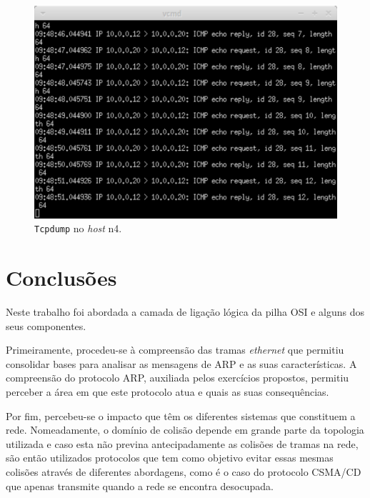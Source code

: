 \documentclass{llncs}
\begin{document}
\begin{figure}
  \begin{center}
	  \includegraphics[scale=0.3]{./imagens/n4_tcpdump_comutador.png} 
  \end{center}
	\caption{\texttt{Tcpdump} no \textit{host} n4.}
  \label{fig:n4_comutador}
\end{figure} 

\clearpage

\section{Conclusões}

\hspace{5mm} Neste trabalho foi abordada a camada de ligação lógica da pilha OSI e alguns dos seus componentes. 

Primeiramente, procedeu-se à compreensão das tramas \textit{ethernet} que permitiu consolidar bases para analisar as mensagens de ARP e as suas características. A compreensão do protocolo ARP, auxiliada pelos exercícios propostos, permitiu perceber a área em que este protocolo atua e quais as suas consequências.

Por fim, percebeu-se o impacto que têm os diferentes sistemas que constituem a rede. Nomeadamente, o domínio de colisão depende em grande parte da topologia utilizada e caso esta não previna antecipadamente as colisões de tramas na rede, são então utilizados protocolos que tem como objetivo evitar essas mesmas colisões através de diferentes abordagens, como é o caso do protocolo CSMA/CD que apenas transmite quando a rede se encontra desocupada.



\end{document}
